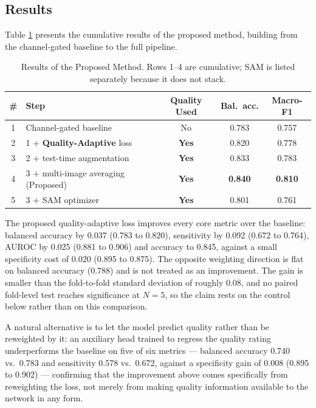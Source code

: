 \documentclass[conference]{IEEEtran}
\begin{document}
\subsection{Results}
\label{sec:main}
Table \ref{tab:breakdown} presents the cumulative results of the proposed method, building from the channel-gated baseline to the full pipeline.
\begin{table}[htbp]
\caption{Results of the Proposed Method. Rows 1--4 are cumulative; SAM is listed separately because it does not stack.}
\label{tab:breakdown}
\centering
\scriptsize
\setlength{\tabcolsep}{3pt}
\begin{tabular}{|c|l|c|c|c|}
\hline
\textbf{\#} & \textbf{Step} & \textbf{Quality Used} & \textbf{Bal.\ acc.} & \textbf{Macro-F1} \\
\hline
1 & Channel-gated baseline & No & 0.783 & 0.757 \\
2 & 1 $+$ \textbf{Quality-Adaptive} loss & \textbf{Yes} & 0.820 & 0.778 \\
3 & 2 $+$ test-time augmentation & \textbf{Yes} & 0.833 & 0.783 \\
4 & 3 $+$ multi-image averaging (Proposed) & \textbf{Yes} & \textbf{0.840} & \textbf{0.810} \\
\hline
5 & 3 $+$ SAM optimizer & \textbf{Yes} & 0.801 & 0.761 \\
\hline
\end{tabular}
\end{table}
The proposed quality-adaptive loss improves every core metric over the baseline: balanced accuracy by 0.037 (0.783 to 0.820), sensitivity by 0.092 (0.672 to 0.764), AUROC by 0.025 (0.881 to 0.906) and accuracy to 0.845, against a small specificity cost of 0.020 (0.895 to 0.875). The opposite weighting direction is flat on balanced accuracy (0.788) and is not treated as an improvement. The gain is smaller than the fold-to-fold standard deviation of roughly 0.08, and no paired fold-level test reaches significance at $N=5$, so the claim rests on the control below rather than on this comparison.

A natural alternative is to let the model predict quality rather than be reweighted by it: an auxiliary head trained to regress the quality rating underperforms the baseline on five of six metrics --- balanced accuracy 0.740 vs.\ 0.783 and sensitivity 0.578 vs.\ 0.672, against a specificity gain of 0.008 (0.895 to 0.902) --- confirming that the improvement above comes specifically from reweighting the loss, not merely from making quality information available to the network in any form.
\end{document}
